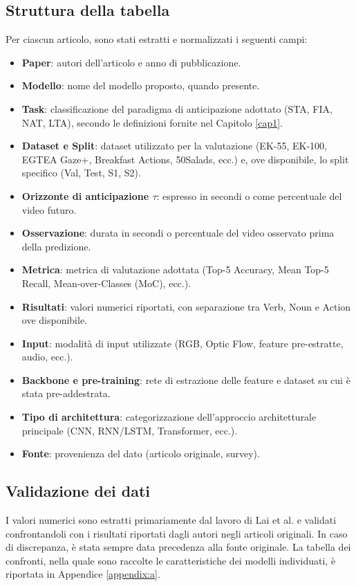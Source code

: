 \subsection{Struttura della tabella}
Per ciascun articolo, sono stati estratti e normalizzati i seguenti campi:
\begin{itemize}
    \item \textbf{Paper}: autori dell'articolo e anno di pubblicazione.
    \item \textbf{Modello}: nome del modello proposto, quando presente.
    \item \textbf{Task}: classificazione del paradigma di anticipazione adottato (STA, FIA, NAT, LTA), secondo le definizioni fornite nel Capitolo \ref{cap1}.
    \item \textbf{Dataset e Split}: dataset utilizzato per la valutazione (EK-55, EK-100, EGTEA Gaze+, Breakfast Actions, 50Salads, ecc.) e, ove disponibile, lo split specifico (Val, Test, S1, S2).
    \item \textbf{Orizzonte di anticipazione $\tau$}: espresso in secondi o come percentuale del video futuro.
    \item \textbf{Osservazione}: durata in secondi o percentuale del video osservato prima della predizione.
    \item \textbf{Metrica}: metrica di valutazione adottata (Top-5 Accuracy, Mean Top-5 Recall, Mean-over-Classes (MoC), ecc.).
    \item \textbf{Risultati}: valori numerici riportati, con separazione tra Verb, Noun e Action ove disponibile.
    \item \textbf{Input}: modalità di input utilizzate (RGB, Optic Flow, feature pre-estratte, audio, ecc.).
    \item \textbf{Backbone e pre-training}: rete di estrazione delle feature e dataset su cui è stata pre-addestrata.
    \item \textbf{Tipo di architettura}: categorizzazione dell'approccio architetturale principale (CNN, RNN/LSTM, Transformer, ecc.).
    \item \textbf{Fonte}: provenienza del dato (articolo originale, survey).
\end{itemize}

\subsection{Validazione dei dati}
I valori numerici sono estratti primariamente dal lavoro di Lai et al. \cite{lai2024human} e validati confrontandoli con i risultati riportati dagli autori negli articoli originali. In caso di discrepanza, è stata sempre data precedenza alla fonte originale. La tabella dei confronti, nella quale sono raccolte le caratteristiche dei modelli individuati, è riportata in Appendice \ref{appendix:a}.


